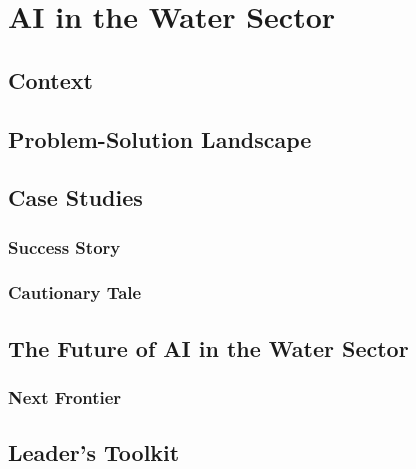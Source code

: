 \chapter{AI in the Water Sector}
\label{chap:ai_in_water}

\section{Context}
\label{sec:water_context}

\section{Problem-Solution Landscape}
\label{sec:water_problem_solution}

\section{Case Studies}
\label{sec:water_case_studies}
\subsection{Success Story}
\label{sec:water_success_story}
\subsection{Cautionary Tale}
\label{sec:water_cautionary_tale}

\section{The Future of AI in the Water Sector}
\label{sec:future_of_ai_in_water}
\subsection{Next Frontier}
\label{sec:water_next_frontier}

\section{Leader's Toolkit}
\label{sec:water_leaders_toolkit}